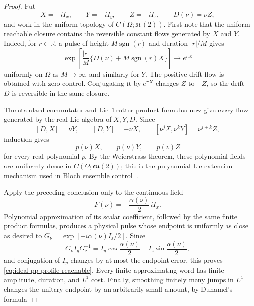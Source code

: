 \documentclass[11pt]{article}
\theoremstyle{remark}
\begin{document}
\begin{proof}
Put
\[
 X=-iI_x,\qquad Y=-iI_y,\qquad Z=-iI_z,\qquad D(\nu)=\nu Z,
\]
and work in the uniform topology of
$C(\Omega;\mathfrak{su}(2))$.  First note that the uniform reachable closure
contains the reversible constant flows generated by $X$ and $Y$.  Indeed,
for $r\in\mathbb R$, a pulse of height
$M\operatorname{sgn}(r)$ and duration $|r|/M$ gives
\[
 \exp\!\left[
  \frac{|r|}{M}
  \{D(\nu)+M\operatorname{sgn}(r)X\}
 \right]
 \longrightarrow e^{rX}
\]
uniformly on $\Omega$ as $M\to\infty$, and similarly for $Y$.  The positive
drift flow is obtained with zero control.  Conjugating it by
$e^{\pi X}$ changes $Z$ to $-Z$, so the drift $D$ is reversible in the same
closure.

The standard commutator and Lie--Trotter product formulas now give every
flow generated by the real Lie algebra of $X,Y,D$.  Since
\[
 [D,X]=\nu Y,\qquad [D,Y]=-\nu X,\qquad
 [\nu^jX,\nu^kY]=\nu^{j+k}Z,
\]
induction gives
\[
 p(\nu)X,\qquad p(\nu)Y,\qquad p(\nu)Z
\]
for every real polynomial $p$.  By the Weierstrass theorem, these polynomial
fields are uniformly dense in
$C(\Omega;\mathfrak{su}(2))$; this is the polynomial Lie-extension mechanism
used in Bloch ensemble control~\cite{LiKhaneja2009}.

Apply the preceding conclusion only to the continuous field
\[
 F(\nu)=-\frac{\alpha(\nu)}2\,iI_x .
\]
Polynomial approximation of its scalar coefficient, followed by the same
finite product formulas, produces a physical pulse whose endpoint is
uniformly as close as desired to
$G_\nu=\exp[-i\alpha(\nu)I_x/2]$.  Since
\[
 G_\nu I_yG_\nu^{-1}
 =
 I_y\cos\frac{\alpha(\nu)}2
 +I_z\sin\frac{\alpha(\nu)}2,
\]
and conjugation of $I_y$ changes by at most the endpoint error, this proves
\eqref{eq:ideal-pp-profile-reachable}.  Every finite approximating word has
finite amplitude, duration, and $L^1$ cost.  Finally, smoothing finitely many
jumps in $L^1$ changes the unitary endpoint by an arbitrarily small amount,
by Duhamel's formula.
\end{proof}
\end{document}
